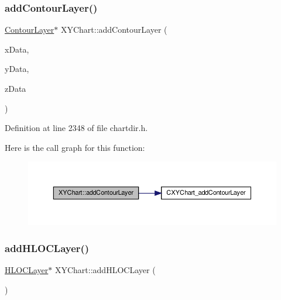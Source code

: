 \subsubsection{\texorpdfstring{add\+Contour\+Layer()}{addContourLayer()}}
{\footnotesize\ttfamily \hyperlink{class_contour_layer}{Contour\+Layer}$\ast$ X\+Y\+Chart\+::add\+Contour\+Layer (\begin{DoxyParamCaption}\item[{\hyperlink{class_double_array}{Double\+Array}}]{x\+Data,  }\item[{\hyperlink{class_double_array}{Double\+Array}}]{y\+Data,  }\item[{\hyperlink{class_double_array}{Double\+Array}}]{z\+Data }\end{DoxyParamCaption})\hspace{0.3cm}{\ttfamily [inline]}}



Definition at line 2348 of file chartdir.\+h.

Here is the call graph for this function\+:
\nopagebreak
\begin{figure}[H]
\begin{center}
\leavevmode
\includegraphics[width=350pt]{class_x_y_chart_a43cb04a6549ac473640df206e3a8b20f_cgraph}
\end{center}
\end{figure}
\mbox{\label{class_x_y_chart_adba2697a37e2367ce4f0a53611973098}} 
\subsubsection{\texorpdfstring{add\+H\+L\+O\+C\+Layer()}{addHLOCLayer()}\hspace{0.1cm}{\footnotesize\ttfamily [1/4]}}
{\footnotesize\ttfamily \hyperlink{class_h_l_o_c_layer}{H\+L\+O\+C\+Layer}$\ast$ X\+Y\+Chart\+::add\+H\+L\+O\+C\+Layer (\begin{DoxyParamCaption}{ }\end{DoxyParamCaption})\hspace{0.3cm}{\ttfamily [inline]}}



